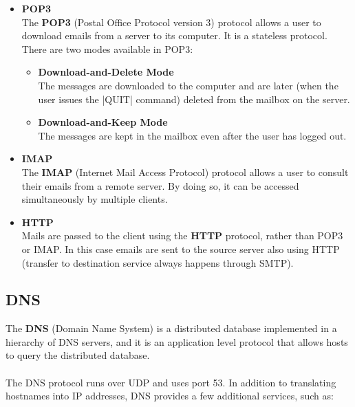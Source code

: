 \documentclass{article}
\begin{document}
\begin{itemize}
	\item \textbf{POP3}
	\vspace{.2cm} \\
	The \textbf{POP3} (Postal Office Protocol version 3) protocol allows a user to download emails from a server to its computer. It is a stateless protocol. There are two modes available in POP3:
	
	\begin{itemize}
		\item \textbf{Download-and-Delete Mode}
		\vspace{.2cm} \\
		The messages are downloaded to the computer and are later (when the user issues the \cverb|QUIT| command) deleted from the mailbox on the server.
		
		\item \textbf{Download-and-Keep Mode}
		\vspace{.2cm} \\
		The messages are kept in the mailbox even after the user has logged out.
	\end{itemize}
	
	\item \textbf{IMAP}
	\vspace{.2cm} \\
	The \textbf{IMAP} (Internet Mail Access Protocol) protocol allows a user to consult their emails from a remote server. By doing so, it can be accessed simultaneously by multiple clients.
	\item \textbf{HTTP}
	\vspace{.2cm} \\
	Mails are passed to the client using the \textbf{HTTP} protocol, rather than POP3 or IMAP. In this case emails are sent to the source server also using HTTP (transfer to destination service always happens through SMTP).
\end{itemize}

\subsection{DNS}
The \textbf{DNS} (Domain Name System) is a distributed database implemented in a hierarchy of DNS servers, and it is an application level protocol that allows hosts to query the distributed database. \\ \\
The DNS protocol runs over UDP and uses port 53. In addition to translating hostnames into IP addresses, DNS provides a few additional services, such as:
\end{document}
